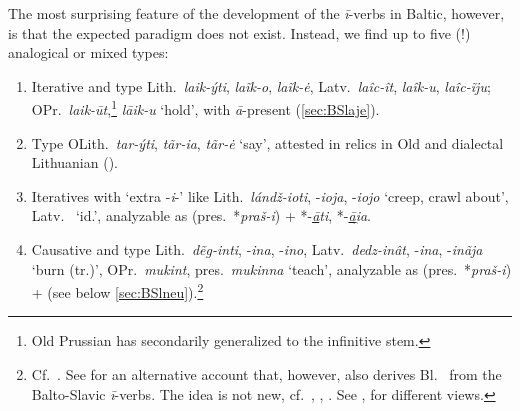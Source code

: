 \documentclass[output=paper,colorlinks,citecolor=brown]{langscibook}
\begin{document}
The most surprising feature of the development of the \textit{ī}-verbs in Baltic, however, is that the expected paradigm does not exist. Instead, we find up to five (!) analogical or mixed types:

\begin{enumerate}
    \item Iterative and  type Lith.\ \textit{laik-ýti}, \textit{laĩk-o}, \textit{laĩk-\.e}, Latv.\ \textit{laîc-ît}, \textit{laîk-u}, \textit{laîc-ĩju}; OPr.\ \textit{laik-ūt},\footnote{Old Prussian has secondarily generalized  to the infinitive stem.} \textit{lāik-u} ‘hold’, with \textit{ā}-present (\ref{sec:BSlaje}).

    \item Type OLith.\ \textit{tar-ýti}, \textit{tãr-ia}, \textit{tãr-\.e} ‘say’, attested in relics in Old and dialectal Lithuanian (\citealt[327--328]{Stang1966}). 

    \item Iteratives with ‘extra -\textit{i}-’ like Lith.\ \textit{lándž-ioti}, -\textit{ioja}, -\textit{iojo} ‘creep, crawl about’, Latv.\  ‘id.’, analyzable as  (pres.\ *\textit{praš-i}) + *-\textit{\underline{ā}ti}, *-\textit{\underline{ā}i̯a}.

    \item Causative and  type Lith.\ \textit{dẽg-inti}, -\textit{ina}, -\textit{ino}, Latv.\ \textit{dedz-inât}, -\textit{ina}, \nobreakdash-\textit{inãja} ‘burn (tr.)’, OPr.\ \textit{mukint}, pres.\ \textit{mukinna} ‘teach’, analyzable as  (pres.\ *\textit{praš-i}) +  (see below \ref{sec:BSlneu}).\footnote{Cf.\ \citet{VillanuevaSvenssonforth}. See \citet[175--176]{Gorbachov2007} for an alternative account that, however, also derives Bl.\  from the Balto-Slavic \textit{ī}-verbs. The idea is not new, cf.\ \citet[411]{Otrebski1965}, \citet[227--228]{Vaillant1966}, \citet[173]{Schmalstieg2000}. See \citet{Kortlandt1989}, \citet{Hajnal1996} for different views.}


\end{enumerate}
\end{document}
